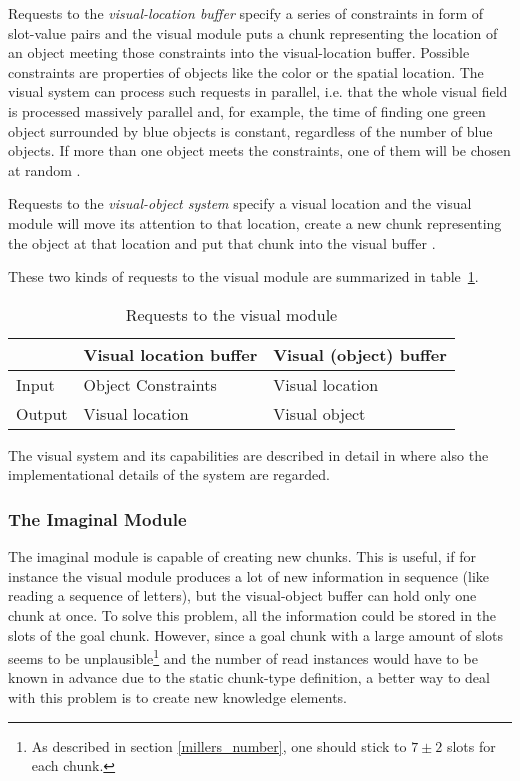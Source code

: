 Requests to the \emph{visual-location buffer} specify a series of constraints in form of slot-value pairs and the visual module puts a chunk representing the location of an object meeting those constraints into the visual-location buffer. Possible constraints are properties of objects like the color or the spatial location. The visual system can process such requests in parallel, i.e. that the whole visual field is processed massively parallel and, for example, the time of finding one green object surrounded by blue objects is constant, regardless of the number of blue objects. If more than one object meets the constraints, one of them will be chosen at random \cites[1039]{anderson_integrated_2004}[68]{anderson_how_2007}.

Requests to the \emph{visual-object system} specify a visual location and the visual module will move its attention to that location, create a new chunk representing the object at that location and put that chunk into the visual buffer \cite[unit 2, chapter 2.5.3]{actr_tutorial}. 

These two kinds of requests to the visual module are summarized in table~\ref{tab:visual_module_requests}.

\begin{table}[hbt]
\caption{Requests to the visual module}
\label{tab:visual_module_requests}
\begin{center}
\begin{tabular}{|l|ll|}
\hline
 & Visual location buffer & Visual (object) buffer\\
\hline
Input & Object Constraints & Visual location\\
Output & Visual location & Visual object\\
\hline
\end{tabular}
\end{center}
\end{table}

The visual system and its capabilities are described in detail in \cite[unit 2]{actr_tutorial} where also the implementational details of the system are regarded.

\subsubsection{The Imaginal Module}
\label{actr:imaginal_module}

The imaginal module is capable of creating new chunks. This is useful, if for instance the visual module produces a lot of new information in sequence (like reading a sequence of letters), but the visual-object buffer can hold only one chunk at once. To solve this problem, all the information could be stored in the slots of the goal chunk. However, since a goal chunk with a large amount of slots seems to be unplausible\footnote{As described in section \ref{millers_number}, one should stick to $7 \pm 2$ slots for each chunk.} and the number of read instances would have to be known in advance due to the static chunk-type definition, a better way to deal with this problem is to create new knowledge elements.

